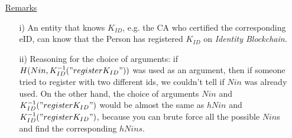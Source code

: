 \documentclass{article}
\newcommand{\kid}{K_{ID}}
\newcommand{\pbc}{\textit{Identity Blockchain}}
\begin{document}
\begin{enumerate}[leftmargin=0cm]
\item[] \underline{Remarks}
\begin{itemize}
\item[i)] An entity that knows $\kid$, e.g. the CA who certified the corresponding eID, can know that the Person has registered $\kid$ on \pbc{}.
\item[ii)] Reasoning for the choice of arguments: if $H(Nin, \kid^{-1}("register\kid"))$ was used as an argument, then if someone tried to register with two different ids, we couldn't tell if $Nin$ was already used. On the other hand, the choice of arguments $Nin$ and $\kid^{-1}("register\kid")$ would be almost the same as $hNin$ and $\kid^{-1}("register\kid")$, because you can brute force all the possible $Nin$s and find the corresponding $hNins$.
\end{itemize}
\end{enumerate}

\newpage
\end{document}
